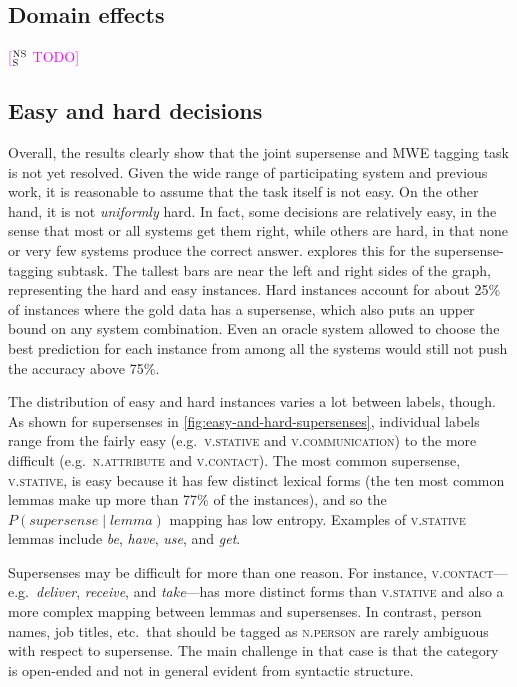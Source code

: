 \documentclass[11pt,letterpaper]{article}
\newcommand{\ensuretext}[1]{#1}
\newcommand{\nssmarker}{\ensuretext{\textcolor{magenta}{\ensuremath{^{\textsc{NS}}_{\textsc{S}}}}}}
\newcommand{\arkcomment}[3]{\ensuretext{\textcolor{#3}{[#1 #2]}}}
\newcommand{\nss}[1]{\arkcomment{\nssmarker}{#1}{magenta}}
\begin{document}
\subsection{Domain effects}

\nss{TODO}

\subsection{Easy and hard decisions}

Overall, the results clearly show that the joint supersense and MWE tagging task is not yet resolved. 
Given the wide range of participating system and previous work, it is reasonable to assume that 
the task itself is not easy. On the other hand, it is not \emph{uniformly} hard. 
In fact, some decisions are relatively easy, in the sense that most or all systems get them right, 
while others are hard, in that none or very few systems produce the correct answer. 
 explores this for the supersense-tagging subtask. 
The tallest bars are near the left and right sides of the graph, representing the hard and easy instances. 
Hard instances account for about 25\% of instances where the gold data has a supersense, 
which also puts an upper bound on any system combination. 
Even an oracle system allowed to choose the best prediction for each instance 
from among all the systems would still not push the accuracy above 75\%.

The distribution of easy and hard instances varies a lot between labels, though. 
As shown for supersenses in \cref{fig:easy-and-hard-supersenses}, 
individual labels range from the fairly easy (e.g.\ \textsc{v.stative} and \textsc{v.communication}) 
to the more difficult (e.g.\ \textsc{n.attribute} and \textsc{v.contact}). 
The most common supersense, \textsc{v.stative}, is easy because it has few distinct lexical forms 
(the ten most common lemmas make up more than 77\% of the instances), and so the
$P(\textit{supersense} \mid \textit{lemma})$ mapping has low entropy. 
Examples of \textsc{v.stative} lemmas include \emph{be}, \emph{have}, \emph{use}, and \emph{get}. 

Supersenses may be difficult for more than one reason. 
For instance, \textsc{v.contact}---e.g.\ \emph{deliver}, \emph{receive}, and \emph{take}---has more distinct forms 
than \textsc{v.stative} and also a more complex mapping between lemmas and supersenses. 
In contrast, person names, job titles, etc.\ that should be tagged as \textsc{n.person} are rarely ambiguous
with respect to supersense. The main challenge in that case is that the category is open-ended 
and not in general evident from syntactic structure.
\end{document}
